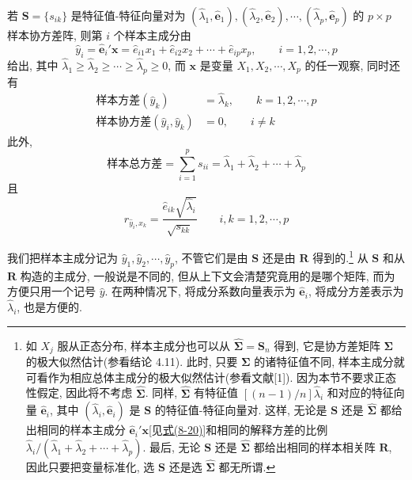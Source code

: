 
\begin{mvbox}
若 $\mathbf{S}=\{s_{ik}\}$ 是特征值-特征向量对为 $(\hat{\lambda}_1,\hat{\mathbf{e}}_1),(\hat{\lambda}_2,\hat{\mathbf{e}}_2),\cdots,(\hat{\lambda}_p,\hat{\mathbf{e}}_p)$ 的 $p\times p$ 样本协方差阵, 则第 $i$ 个样本主成分由
\[
\hat{y}_i=\hat{\mathbf{e}}_i'\mathbf{x}=\hat{e}_{i1}x_1+\hat{e}_{i2}x_2+\cdots+\hat{e}_{ip}x_p,\qquad i=1,2,\cdots,p
\]
给出, 其中 $\hat{\lambda}_1\geqslant\hat{\lambda}_2\geqslant\cdots\geqslant\hat{\lambda}_p\geqslant 0$, 而 $\mathbf{x}$ 是变量 $X_1,X_2,\cdots,X_p$ 的任一观察, 同时还有
\label{eq:8-20}
\begin{equation}
\begin{aligned}
\text{样本方差}(\hat{y}_k)&=\hat{\lambda}_k,\qquad k=1,2,\cdots,p\\
\text{样本协方差}(\hat{y}_i,\hat{y}_k)&=0,\qquad i\neq k
\end{aligned}
\tag{8-20}
\end{equation}
此外,
\[
\text{样本总方差}=\sum_{i=1}^{p}s_{ii}=\hat{\lambda}_1+\hat{\lambda}_2+\cdots+\hat{\lambda}_p
\]
且
\[
r_{\hat{y}_i,x_k}=\frac{\hat{e}_{ik}\sqrt{\hat{\lambda}_i}}{\sqrt{s_{kk}}}\qquad i,k=1,2,\cdots,p
\]
\end{mvbox}

我们把样本主成分记为 $\hat{y}_1,\hat{y}_2,\cdots,\hat{y}_p$, 不管它们是由 $\mathbf{S}$ 还是由 $\mathbf{R}$ 得到的.\footnote{{\footnotesize 如 $X_j$ 服从正态分布, 样本主成分也可以从 $\hat{\boldsymbol{\Sigma}}=\mathbf{S}_n$ 得到, 它是协方差矩阵 $\boldsymbol{\Sigma}$ 的极大似然估计(参看结论 4.11). 此时, 只要 $\boldsymbol{\Sigma}$ 的诸特征值不同, 样本主成分就可看作为相应总体主成分的极大似然估计(参看文献[1]). 因为本节不要求正态性假定, 因此将不考虑 $\hat{\boldsymbol{\Sigma}}$. 同样, $\hat{\boldsymbol{\Sigma}}$ 有特征值 $[(n-1)/n]\hat{\lambda}_i$ 和对应的特征向量 $\hat{\mathbf{e}}_i$, 其中 $(\hat{\lambda}_i,\hat{\mathbf{e}}_i)$ 是 $\mathbf{S}$ 的特征值-特征向量对. 这样, 无论是 $\mathbf{S}$ 还是 $\hat{\boldsymbol{\Sigma}}$ 都给出相同的样本主成分 $\hat{\mathbf{e}}_i'\mathbf{x}$[见\hyperref[eq:8-20]{式(8-20)}]和相同的解释方差的比例 $\hat{\lambda}_i/(\hat{\lambda}_1+\hat{\lambda}_2+\cdots+\hat{\lambda}_p)$. 最后, 无论 $\mathbf{S}$ 还是 $\hat{\boldsymbol{\Sigma}}$ 都给出相同的样本相关阵 $\mathbf{R}$, 因此只要把变量标准化, 选 $\mathbf{S}$ 还是选 $\hat{\boldsymbol{\Sigma}}$ 都无所谓.}} 从 $\mathbf{S}$ 和从 $\mathbf{R}$ 构造的主成分, 一般说是不同的, 但从上下文会清楚究竟用的是哪个矩阵, 而为方便只用一个记号 $\hat{y}$. 在两种情况下, 将成分系数向量表示为 $\hat{\mathbf{e}}_i$, 将成分方差表示为 $\hat{\lambda}_i$, 也是方便的.

